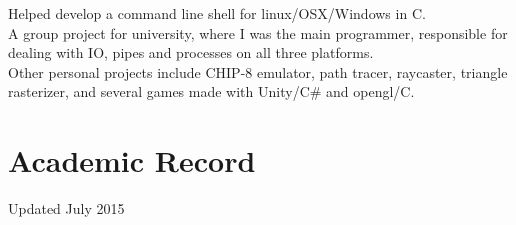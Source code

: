 \documentclass[a4paper, oneside, final]{scrartcl}
\begin{document}
	\noindent
	Helped develop a command line shell for linux/OSX/Windows in C.\\
	A group project for university, where I was the main programmer, responsible for dealing with IO, pipes and processes on all three platforms.\\

	\noindent
	Other personal projects include CHIP-8 emulator, path tracer, raycaster, triangle rasterizer, and several games made with Unity/C\# and opengl/C.\\

    
	\iffalse
      \pagebreak
      \section{Academic Record}
      Updated July 2015
\end{document}
